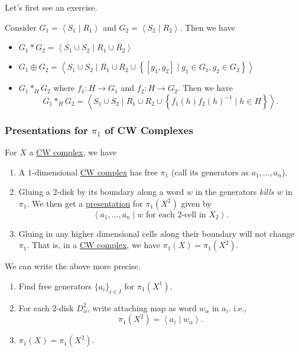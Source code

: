 Let's first see an exercise.
\begin{exercise}
	Consider \(G_1 = \left< S_1 \mid R_1 \right> \) and \(G_2 = \left< S_2 \mid R_2 \right> \). Then we have
	\begin{itemize}
		\item \(G_1\ast G_2 = \left< S_{1}\cup S_2  \mid R_1 \cup R_2 \right> \)
		\item \(G_1\oplus G_2 = \left< S_1 \cup S_2  \mid R_1 \cup R_2\cup \left\{[g_1, g_2] \mid g_1\in G_1, g_2\in G_2\right\} \right> \)
		\item \(G_1 \ast_H G_2 \) where \(f_1\colon H\to G_1\) and \(f_2\colon H\to G_2\). Then we have
		      \[
			      G_1\ast_H G_2 = \left< S_1 \cup S_2  \mid R_1 \cup  R_2\cup \left\{f_1(h)f_2(h)^{-1}  \mid h\in H\right\} \right>.
		      \]
	\end{itemize}
\end{exercise}

\subsubsection{Presentations for \(\pi _1\) of CW Complexes}
For \(X\) a \hyperref[def:CW-Complex]{CW complex}, we have
\begin{enumerate}
	\item A \(1\)-dimensional \hyperref[def:CW-Complex]{CW complex} has free \(\pi _1\) (call its generators as \(a_1, \ldots , a_n \)).
	\item Gluing a \(2\)-disk by its boundary along a word \(w\) in the generators \emph{kills} \(w\) in \(\pi _1\). We then get a \hyperref[def:group-presentation]{presentation} for \(\pi _1(X^2)\)
	      given by
	      \[
		      \left< a_1, \ldots , a_n \mid w \text{ for each \(2\)-cell in \(X_2\)}\right>.
	      \]
	\item Gluing in any higher dimensional cells along their boundary will not change \(\pi _1\). That is, in a \hyperref[def:CW-Complex]{CW complex},
	      we have \(\pi _1(X) = \pi _1(X^2)\).
\end{enumerate}

\begin{remark}
	We can write the above more precise.
	\begin{enumerate}
		\item Find free generators \(\{a _i\}_{i\in I}\) for \(\pi _1(X^1)\).
		\item For each \(2\)-disk \(D^2_\alpha \), write attaching map as word \(w_\alpha \) in \(a_{i}\). i.e.,
		      \[
			      \pi _1(X^2) = \left< a_{i} \mid w_\alpha  \right>.
		      \]
		\item \(\pi_1(X) = \pi _1(X^2)\).
	\end{enumerate}
\end{remark}

